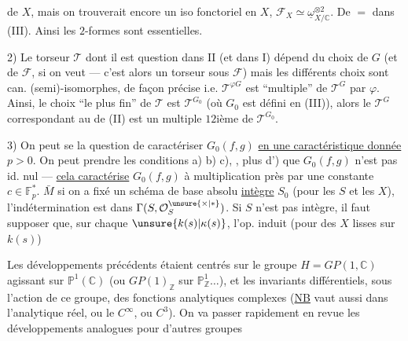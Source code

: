  de $X$, mais on trouverait encore
un iso fonctoriel en $X$, $\mathcal{F}_X\simeq\underline{\omega}_{X/\mathbb{C}}^{\otimes2}$.
De $=$ dans (III). Ainsi les $2$-formes sont essentielles.

2)  Le torseur $\mathcal{T}$ dont il est question dans
II (et  dans I) dépend du choix de
$G$ (et de $\mathcal{F}$, si on veut --- c'est alors un
torseur sous $\mathcal{F}$) mais les  différents choix
sont can. (semi)-isomorphes, de façon précise
i.e. $\mathcal{T}^{\varphi G}$ est ``multiple'' de $\mathcal{T}^{G}$ par $\varphi$.
Ainsi, le choix ``le plus fin'' de $\mathcal{T}$ est $\mathcal{T}^{G_0}$
(où $G_0$ est défini en (III)), alors le $\mathcal{T}^{G}$
correspondant au   de (II) est un
multiple $12$ième de $\mathcal{T}^{G_0}$.

3) On peut se  la question
de caractériser $G_0(f,g)$ \uline{en une caractéristique donnée} $p>0$.
On peut prendre les conditions
a) b) c), , plus d') que $G_0(f,g)$ n'est pas id. nul
--- \uline{cela caractérise} $G_0(f,g)$ à multiplication près
par une constante $c\in\mathbb{F}_p^{*}$.
$\bar{M}$  si
on a fixé un schéma de base absolu
\uline{intègre} $S_0$ (pour les $S$ et les $X$), l'indétermination
est dans $\Gamma(S,\mathcal{O}_S^{\unsure{\times|*}})$.
Si $S$ n'est pas intègre, il faut supposer que, sur chaque
$\unsure{k(s)|\kappa(s)}$, l'op. induit (pour des $X$ lisses
 sur $k(s)$)


Les développements précédents étaient centrés
sur le groupe $H=GP(1,\mathbb{C})$ agissant sur $\mathbb{P}^{1}(\mathbb{C})$
(ou $GP(1)_{\mathbb{Z}}$ sur $\mathbb{P}^{1}_{\mathbb{Z}}\ldots$), et les invariants
différentiels, sous l'action de ce groupe, des
fonctions analytiques complexes (\uline{NB} 
vaut aussi dans l'analytique réel, ou le
$C^{\infty}$, ou $C^3$).
On va passer rapidement en revue les développements
analogues pour d'autres groupes

